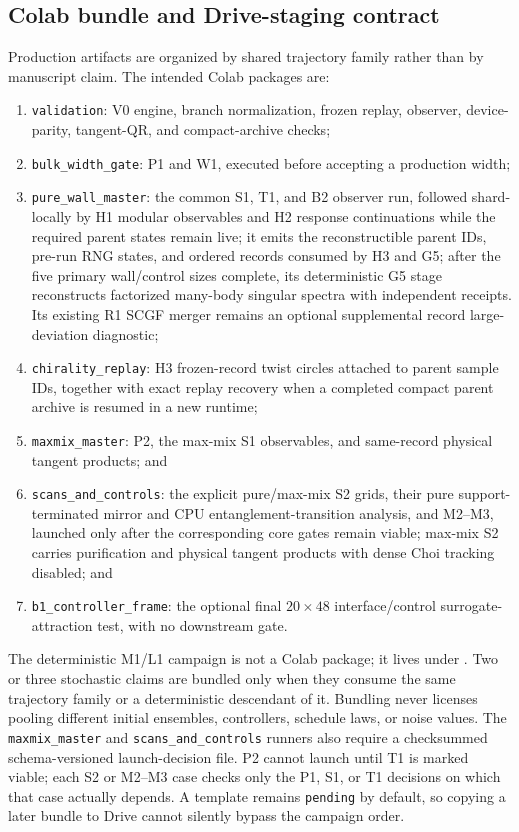 \documentclass[aps,prx,twocolumn,floatfix,nofootinbib,superscriptaddress,longbibliography]{revtex4-2}
\newcommand{\code}[1]{\texttt{#1}}
\begin{document}
\subsection{Colab bundle and Drive-staging contract}

Production artifacts are organized by shared trajectory family rather than by manuscript
claim.  The intended Colab packages are:
\begin{enumerate}
\item \code{validation}: V0 engine, branch normalization, frozen replay, observer,
      device-parity, tangent-QR, and compact-archive checks;
\item \code{bulk\_width\_gate}: P1 and W1, executed before accepting a production width;
\item \code{pure\_wall\_master}: the common S1, T1, and B2 observer run, followed
      shard-locally by H1 modular observables and H2 response continuations while the
      required parent states remain live; it emits the reconstructible parent IDs, pre-run
      RNG states, and ordered records consumed by H3 and G5; after the five primary
      wall/control sizes complete, its deterministic G5 stage reconstructs factorized
      many-body singular spectra with independent receipts.  Its existing R1 SCGF merger
      remains an optional supplemental record large-deviation diagnostic;
\item \code{chirality\_replay}: H3 frozen-record twist circles attached to parent sample
      IDs, together with exact replay recovery when a completed compact parent archive is
      resumed in a new runtime;
\item \code{maxmix\_master}: P2, the max-mix S1 observables, and same-record physical
      tangent products; and
\item \code{scans\_and\_controls}: the explicit pure/max-mix S2 grids, their pure
      support-terminated mirror and CPU entanglement-transition analysis, and M2--M3,
      launched only after the corresponding core gates remain viable; max-mix S2
      carries purification and physical tangent products with dense Choi tracking disabled; and
\item \code{b1\_controller\_frame}: the optional final $20\times48$ interface/control
      surrogate-attraction test, with no downstream gate.
\end{enumerate}
The deterministic M1/L1 campaign is not a Colab package; it lives under
.  Two or three stochastic
claims are bundled only when they consume the same trajectory family or a
deterministic descendant of it.  Bundling never licenses pooling different initial
ensembles, controllers, schedule laws, or noise values.
The \code{maxmix\_master} and \code{scans\_and\_controls} runners also require a
checksummed schema-versioned launch-decision file.  P2 cannot launch until T1 is marked
viable; each S2 or M2--M3 case checks only the P1, S1, or T1 decisions on which that case
actually depends.  A template remains \code{pending} by default, so copying a later bundle
to Drive cannot silently bypass the campaign order.
\end{document}
